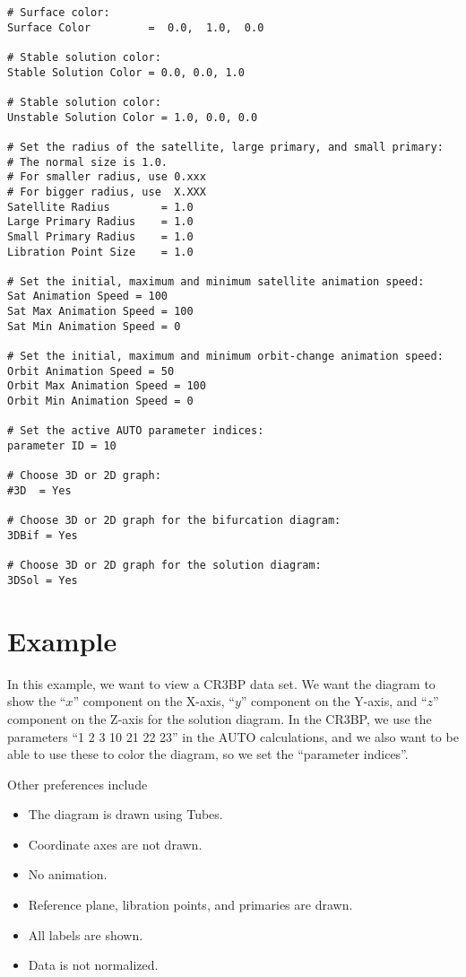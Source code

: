 {\begin{verbatim}
# Surface color:
Surface Color         =  0.0,  1.0,  0.0

# Stable solution color:
Stable Solution Color = 0.0, 0.0, 1.0

# Stable solution color:
Unstable Solution Color = 1.0, 0.0, 0.0

# Set the radius of the satellite, large primary, and small primary:
# The normal size is 1.0.
# For smaller radius, use 0.xxx
# For bigger radius, use  X.XXX
Satellite Radius        = 1.0
Large Primary Radius    = 1.0
Small Primary Radius    = 1.0
Libration Point Size    = 1.0

# Set the initial, maximum and minimum satellite animation speed:
Sat Animation Speed = 100
Sat Max Animation Speed = 100
Sat Min Animation Speed = 0

# Set the initial, maximum and minimum orbit-change animation speed:
Orbit Animation Speed = 50
Orbit Max Animation Speed = 100
Orbit Min Animation Speed = 0

# Set the active AUTO parameter indices:
parameter ID = 10

# Choose 3D or 2D graph:
#3D  = Yes

# Choose 3D or 2D graph for the bifurcation diagram:
3DBif = Yes

# Choose 3D or 2D graph for the solution diagram:
3DSol = Yes

\end{verbatim}
}

\section{Example}

In this example, we want to view a CR3BP data set.
We want the diagram to show the ``$x$'' component on the X-axis, ``$y$'' component on the Y-axis, and ``$z$'' component on the Z-axis
for the solution diagram.
In the CR3BP, we use the parameters ``1 2 3 10 21 22 23'' in the AUTO
calculations, and we also want to be able to use these to color the diagram, so we set the ``parameter indices''.

Other preferences include
\begin{itemize}
\item The diagram is drawn using Tubes.
\item Coordinate axes are not drawn.
\item No animation.
\item Reference plane, libration points, and primaries are drawn.
\item All labels are shown.
\item Data is not normalized.
\end{itemize}

